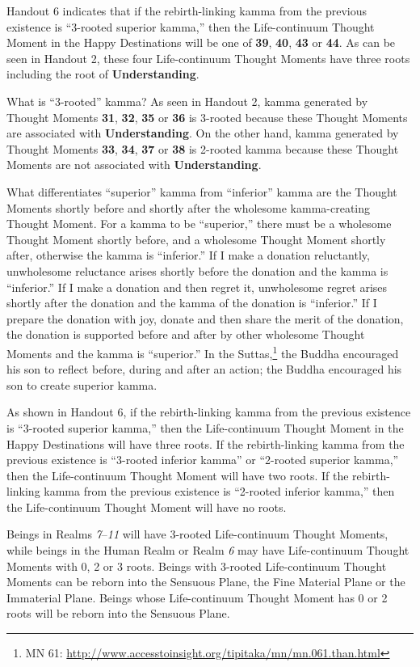 Handout 6 indicates that if the rebirth-linking kamma from the previous existence is “3-rooted superior kamma,” then the Life-continuum Thought Moment in the Happy Destinations will be one of \textbf{39}, \textbf{40}, \textbf{43} or \textbf{44}. As can be seen in Handout 2, these four Life-continuum Thought Moments have three roots including the root of \textbf{Understanding}.

What is “3-rooted” kamma? As seen in Handout 2, kamma generated by Thought Moments \textbf{31}, \textbf{32}, \textbf{35} or \textbf{36} is 3-rooted because these Thought Moments are associated with \textbf{Understanding}. On the other hand, kamma generated by Thought Moments \textbf{33}, \textbf{34}, \textbf{37} or \textbf{38} is 2-rooted kamma because these Thought Moments are not associated with \textbf{Understanding}.

What differentiates “superior” kamma from “inferior” kamma are the Thought Moments shortly before and shortly after the wholesome kamma-creating Thought Moment. For a kamma to be “superior,” there must be a wholesome Thought Moment shortly before, and a wholesome Thought Moment shortly after, otherwise the kamma is “inferior.” If I make a donation reluctantly, unwholesome reluctance arises shortly before the donation and the kamma is “inferior.” If I make a donation and then regret it, unwholesome regret arises shortly after the donation and the kamma of the donation is “inferior.” If I prepare the donation with joy, donate and then share the merit of the donation, the donation is supported before and after by other wholesome Thought Moments and the kamma is “superior.” In the Suttas,\footnote{MN 61: \url{http://www.accesstoinsight.org/tipitaka/mn/mn.061.than.html}} the Buddha encouraged his son to reflect before, during and after an action; the Buddha encouraged his son to create superior kamma.

As shown in Handout 6, if the rebirth-linking kamma from the previous existence is “3-rooted superior kamma,” then the Life-continuum Thought Moment in the Happy Destinations will have three roots. If the rebirth-linking kamma from the previous existence is “3-rooted inferior kamma” or “2-rooted superior kamma,” then the Life-continuum Thought Moment will have two roots. If the rebirth-linking kamma from the previous existence is “2-rooted inferior kamma,” then the Life-continuum Thought Moment will have no roots.

Beings in Realms \textit{7}--\textit{11} will have 3-rooted Life-continuum Thought Moments, while beings in the Human Realm or Realm \textit{6} may have Life-continuum Thought Moments with 0, 2 or 3 roots. Beings with 3-rooted Life-continuum Thought Moments can be reborn into the Sensuous Plane, the Fine Material Plane or the Immaterial Plane. Beings whose Life-continuum Thought Moment has 0 or 2 roots will be reborn into the Sensuous Plane.


